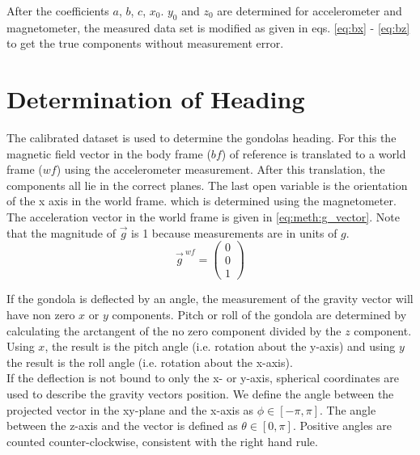 After the coefficients $a$, $b$, $c$, $x_0$. $y_0$ and $z_0$ are determined for accelerometer and magnetometer, the measured data set is modified as given in eqs. \eqref{eq:bx} - \eqref{eq:bz} to get the true components without measurement error.



\section{Determination of Heading \label{sec:meth:determination_heading}}
The calibrated dataset is used to determine the gondolas heading. For this the magnetic field vector in the body frame ($bf$) of reference is translated to a world frame ($wf$) using the accelerometer measurement. After this translation, the components all lie in the correct planes. The last open variable is the orientation of the x axis in the world frame. which is determined using the magnetometer. The acceleration vector in the world frame is given in \eqref{eq:meth:g_vector}. Note that the magnitude of $\vec{g}$ is 1 because measurements are in units of $g$.
\begin{equation}
    \vec{g}^{\ wf}=\begin{pmatrix} 0 \\ 0 \\ 1 \end{pmatrix} \label{eq:meth:g_vector}
\end{equation}

If the gondola is deflected by an angle, the measurement of the gravity vector will have non zero $x$ or $y$ components. Pitch or roll of the gondola are determined by calculating the arctangent of the no zero component divided by the $z$ component. Using $x$, the result is the pitch angle (i.e. rotation about the y-axis) and using $y$ the result is the roll angle (i.e. rotation about the x-axis).\\
If the deflection is not bound to only the x- or y-axis, spherical coordinates are used to describe the gravity vectors position. We define the angle between the projected vector in the xy-plane and the x-axis as $\phi\in[-\pi,\pi]$. The angle between the z-axis and the vector is defined as $\theta\in[0,\pi]$. Positive angles are counted counter-clockwise, consistent with the right hand rule.

